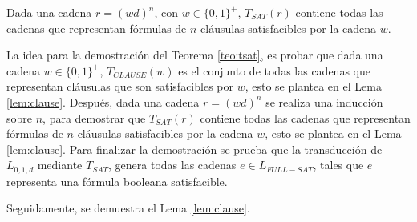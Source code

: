 \begin{lemma}
    \label{lem:sat}
    Dada una cadena $r=(wd)^n$, con $w\in\{0,1\}^+$, $T_{SAT}(r)$ contiene todas las cadenas que representan fórmulas de $n$ cláusulas satisfacibles por la cadena $w$.
\end{lemma}

La idea para la demostración del Teorema \ref{teo:tsat}, es probar que dada una cadena $w\in \{0,1\}^+$, 
$T_{CLAUSE}(w)$ es el conjunto de todas las cadenas que representan cláusulas que son satisfacibles por $w$, 
esto se plantea en el Lema \ref{lem:clause}. Después, dada una cadena $r=(wd)^n$ se realiza una inducción 
sobre $n$, para demostrar que $T_{SAT}(r)$ contiene todas las cadenas que representan fórmulas de $n$
cláusulas satisfacibles por la cadena $w$, esto se plantea en el Lema \ref{lem:clause}.  
Para finalizar la demostración se prueba que la transducción de $L_{0,1,d}$ mediante $T_{SAT}$, 
genera todas las cadenas $e\in L_{FULL-SAT}$, tales que $e$ representa una fórmula booleana 
satisfacible.

Seguidamente, se demuestra el Lema \ref{lem:clause}.

